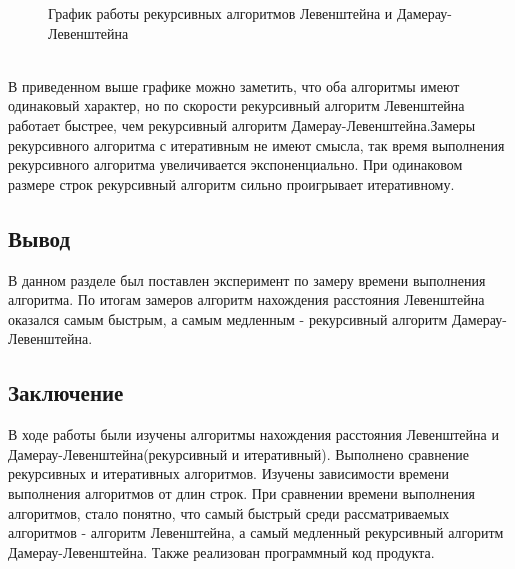 \documentclass[a4paper, 12pt]{article}
\begin{document}
\begin{flushleft}
\begin{figure}[h]
		\centering\caption{График работы рекурсивных алгоритмов Левенштейна и Дамерау-Левенштейна}
	\end{figure}
	\\ \hspace*{5mm} В приведенном выше графике можно заметить, что оба алгоритмы имеют одинаковый характер, но по скорости рекурсивный алгоритм Левенштейна работает быстрее, чем рекурсивный алгоритм Дамерау-Левенштейна.Замеры рекурсивного алгоритма с итеративным не имеют смысла, так время выполнения рекурсивного алгоритма увеличивается экспоненциально. При одинаковом размере строк рекурсивный алгоритм сильно проигрывает итеративному.
	\subsection{Вывод}
	\hspace*{5mm} В данном разделе был поставлен эксперимент по замеру времени выполнения алгоритма. По итогам замеров алгоритм нахождения расстояния Левенштейна оказался самым быстрым, а самым медленным - рекурсивный алгоритм Дамерау-Левенштейна.
\end{flushleft}

\begin{flushleft}
	\newpage
	\section*{Заключение}
	\hspace*{5mm} В ходе работы были изучены алгоритмы нахождения расстояния Левенштейна и Дамерау-Левенштейна(рекурсивный и итеративный). Выполнено сравнение рекурсивных и итеративных алгоритмов. Изучены зависимости времени выполнения алгоритмов от длин строк. При сравнении времени выполнения алгоритмов, стало понятно, что самый быстрый среди рассматриваемых алгоритмов - алгоритм Левенштейна, а самый медленный рекурсивный алгоритм Дамерау-Левенштейна. Также реализован программный код продукта.  
\end{flushleft}
\end{document}

